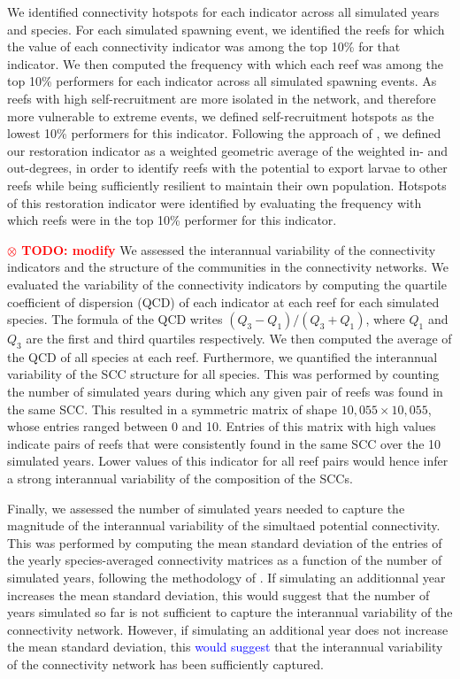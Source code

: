 \documentclass[preprint,12pt,authoryear]{elsarticle}
\newcommand{\modif}[1]{\textcolor{blue}{#1}}
\newcommand{\todo}[1]{\textbf{\textcolor{red}{$\otimes$ TODO: #1}}}
\begin{document}
	We identified connectivity hotspots for each indicator across all simulated years and species. For each simulated spawning event, we identified the reefs for which the value of each connectivity indicator was among the top 10\% for that indicator. We then computed the frequency with which each reef was among the top 10\% performers for each indicator across all simulated spawning events. As reefs with high self-recruitment are more isolated in the network, and therefore more vulnerable to extreme events, we defined self-recruitment hotspots as the lowest 10\% performers for this indicator. Following the approach of \cite{tnc2024}, we defined our restoration indicator as a weighted geometric average of the weighted in- and out-degrees, in order to identify reefs with the potential to export larvae to other reefs while being sufficiently resilient to maintain their own population. Hotspots of this restoration indicator were identified by evaluating the frequency with which reefs were in the top 10\% performer for this indicator.
	
	\todo{modify} We assessed the interannual variability of the connectivity indicators and the structure of the communities in the connectivity networks. We evaluated the variability of the connectivity indicators by computing the quartile coefficient of dispersion (QCD) of each indicator at each reef for each simulated species. The formula of the QCD writes $(Q_3-Q_1) / (Q_3+Q_1)$, where $Q_1$ and $Q_3$ are the first and third quartiles respectively. We then computed the average of the QCD of all species at each reef. Furthermore, we quantified the interannual variability of the SCC structure for all species. This was performed by counting the number of simulated years during which any given pair of reefs was found in the same SCC. This resulted in a symmetric matrix of shape $10,055 \times 10,055$, whose entries ranged between 0 and 10. Entries of this matrix with high values indicate pairs of reefs that were consistently found in the same SCC over the 10 simulated years. Lower values of this indicator for all reef pairs would hence infer a strong interannual variability of the composition of the SCCs.
	
	Finally, we assessed the number of simulated years needed to capture the magnitude of the interannual variability of the simultaed potential connectivity. This was performed by computing the mean standard deviation of the entries of the yearly species-averaged connectivity matrices as a function of the number of simulated years, following the methodology of \cite{thompson2018variability}. If simulating an additionnal year increases the mean standard deviation, this would suggest that the number of years simulated so far is not sufficient to capture the interannual variability of the connectivity network. However, if simulating an additional year does not increase the mean standard deviation, this \modif{would suggest} that the interannual variability of the connectivity network has been sufficiently captured.
	
\end{document}

